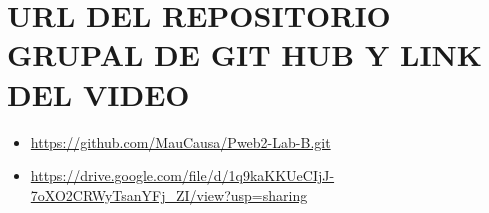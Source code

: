 \section{URL DEL REPOSITORIO GRUPAL DE GIT HUB Y LINK DEL VIDEO}
\begin{itemize}
	\item \url{https://github.com/MauCausa/Pweb2-Lab-B.git}
\end{itemize}
\begin{itemize}
	\item \url{https://drive.google.com/file/d/1q9kaKKUeCIjJ-7oXO2CRWyTsanYFj_ZI/view?usp=sharing}
\end{itemize}

